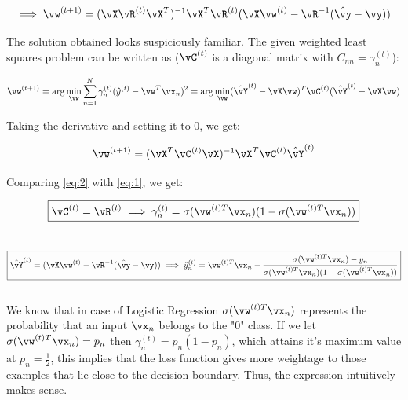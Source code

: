 \documentclass[a4paper,11pt]{article}
\begin{document}
\begin{mlsolution}
\begin{equation} \label{eq:1}
    \implies \vw^{(t+1)} = (\vX\vR^{(t)}\vX^T)^{-1}\vX^T\vR^{(t)}(\vX\vw^{(t)} - \vR^{-1}(\hat{\vy}-\vy))
\end{equation}

The solution obtained looks suspiciously familiar. The given weighted least squares problem can be written as ($\vC^{(t)}$ is a diagonal matrix with $C_{nn} = \gamma_n^{(t)}$):

\begin{equation*}
    \vw^{(t+1)} = \text{arg}\min\limits_\vw\sum_{n=1}^N\gamma_n^{(t)}(\hat{y}^{(t)}-\vw^T\vx_n)^2 = \text{arg}\min\limits_\vw (\hat{\vY}^{(t)}-\vX\vw)^T\vC^{(t)}(\hat{\vY}^{(t)}-\vX\vw)
\end{equation*}

Taking the derivative and setting it to $0$, we get:

\begin{equation} \label{eq:2}
    \vw^{(t+1)} = (\vX^T\vC^{(t)}\vX)^{-1}\vX^T\vC^{(t)}\hat{\vY}^{(t)}
\end{equation}

Comparing \ref{eq:2} with \ref{eq:1}, we get:

\[
    \boxed{
        \vC^{(t)} = \vR^{(t)}\\
        \implies \gamma_n^{(t)} = \sigma(\vw^{(t)T}\vx_n)(1-\sigma(\vw^{(t)T}\vx_n))
    }
\]\\
\[
    \boxed{
        \hat{\vY}^{(t)} = (\vX\vw^{(t)} - \vR^{-1}(\hat{\vy}-\vy))
        \implies \hat{y}^{(t)}_n = \vw^{(t)T}\vx_n - \frac{\sigma(\vw^{(t)T}\vx_n) - y_n}{\sigma(\vw^{(t)T}\vx_n)(1-\sigma(\vw^{(t)T}\vx_n))}
    }
\]\\

We know that in case of Logistic Regression $\sigma(\vw^{(t)T}\vx_n)$ represents the probability that an input $\vx_n$ belongs to the "0" class.
If we let $\sigma(\vw^{(t)T}\vx_n) = p_n$ then $\gamma_n^{(t)} = p_n(1-p_n)$, which attains it's maximum value at $p_n = \frac{1}{2}$, this implies that the loss function gives more weightage to those examples that lie close to the decision boundary. Thus, the expression intuitively makes sense.

\end{mlsolution}
\end{document}
